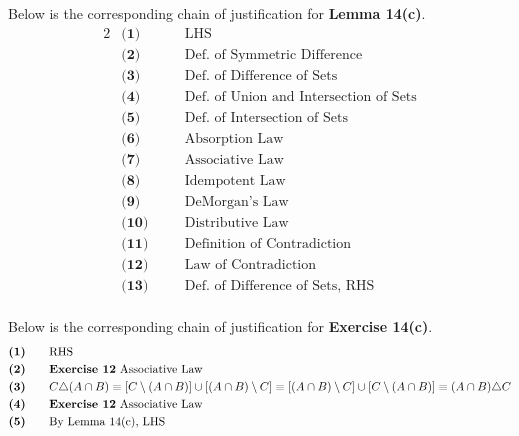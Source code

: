 Below is the corresponding chain of justification for \textbf{Lemma 14(c)}.
\begin{alignat*}{2}
&\textbf{(1)} && \quad \text{LHS}\\
&\textbf{(2)} && \quad \text{Def. of Symmetric Difference}\\
&\textbf{(3)} && \quad \text{Def. of Difference  of Sets}\\
&\textbf{(4)} && \quad \text{Def. of Union and Intersection of Sets}\\
&\textbf{(5)} && \quad \text{Def. of Intersection  of Sets}\\
&\textbf{(6)} && \quad \text{Absorption Law}\\
&\textbf{(7)} && \quad \text{Associative Law}\\
&\textbf{(8)} && \quad \text{Idempotent Law}\\
&\textbf{(9)} && \quad \text{DeMorgan's Law}\\
&\textbf{(10)} && \quad \text{Distributive Law}\\
&\textbf{(11)} && \quad \text{Definition of Contradiction}\\
&\textbf{(12)} && \quad \text{Law of Contradiction}\\
&\textbf{(13)} && \quad \text{Def. of Difference of Sets, RHS}\\
\end{alignat*}

Below is the corresponding chain of justification for \textbf{Exercise 14(c)}.
\begin{alignat*}{2}
&\textbf{(1)} && \quad \text{RHS}\\
&\textbf{(2)} && \quad \text{\textbf{Exercise 12} Associative Law}\\
&\textbf{(3)} && \quad C \triangle (A \cap B) \equiv [C \setminus (A \cap B)] \cup [(A \cap B) \setminus C] \equiv [(A \cap B) \setminus C] \cup [C \setminus (A \cap B)] \equiv (A \cap B) \triangle C\\
&\textbf{(4)} && \quad \text{\textbf{Exercise 12} Associative Law}\\
&\textbf{(5)} && \quad \text{By Lemma 14(c), LHS}\\
\end{alignat*}
\pagebreak